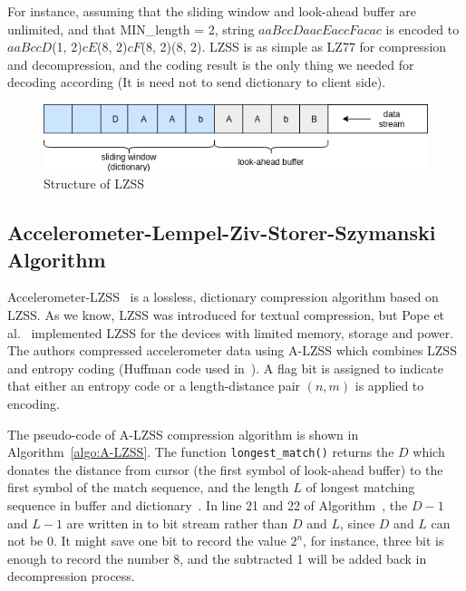 For instance, assuming that the sliding window and look-ahead buffer are unlimited, and that MIN\_length = 2, 
 string $aaBccDaacEaccFacac$ is
encoded to $aaBccD$(1, 2)$cE$(8, 2)$cF$(8, 2)(8, 2). LZSS is as simple as LZ77 for compression
and decompression, and the coding result is the only thing we needed for decoding according (It is need not to send
dictionary to client side).

\begin{figure}
    \centering
    \includegraphics[width=\textwidth]{figures/LZSS.png}
    \caption{Structure of LZSS}
    \label{fig:LZSS}
\end{figure}

\subsection{Accelerometer-Lempel-Ziv-Storer-Szymanski Algorithm}
Accelerometer-LZSS~\cite{pope2018accelerometer} is a lossless, dictionary
compression algorithm based on LZSS. As we know, LZSS was introduced
for textual compression, but Pope et al.~\cite{pope2018accelerometer}
implemented LZSS for the devices with limited memory, storage and power. The
authors compressed accelerometer data using A-LZSS which combines LZSS and
entropy coding (Huffman code used in~\cite{pope2018accelerometer}). A flag bit is
assigned to indicate that either an entropy code or a length-distance pair $(n, m)$ is applied to encoding. 

The pseudo-code of A-LZSS compression algorithm is shown in
Algorithm~\ref{algo:A-LZSS}. The function \texttt{longest\_match()} returns the $D$ which donates the distance from cursor (the first symbol of look-ahead buffer) to the first symbol of the match sequence, and the length $L$ of longest matching sequence in buffer and dictionary~\cite{pope2018accelerometer}. In line 21 and 22 of Algorithm~\cite{pope2018accelerometer}, the $D-1$ and $L-1$ are written in to bit stream rather than $D$ and $L$, since $D$ and $L$ can not be 0. It might save one bit to record the value $2^n$, for instance, three bit is enough to record the number 8, and the subtracted 1 will be added back in decompression process.

